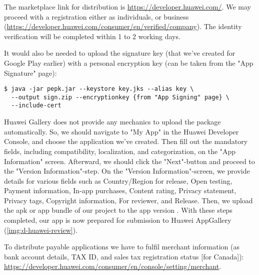 The marketplace link for distribution is \href{https://developer.huawei.com/}{https://developer.huawei.com/}.
We may proceed with a registration either as individuals, or business 
(\href{https://developer.huawei.com/consumer/en/verified/company}{https://developer.huawei.com/consumer/en/verified/company}).
The identity verification will be completed within 1 to 2 working days.

It would also be needed to upload the signature key (that we've created for Google Play earlier) with a 
personal encryption key (can be taken from the "App Signature" page):

\begin{lstlisting}[language=terminal]
$ java -jar pepk.jar --keystore key.jks --alias key \
  --output sign.zip --encryptionkey {from "App Signing" page} \
  --include-cert
\end{lstlisting}


\noindent Huawei Gallery does not provide any mechanics to upload the package automatically. So, we should navigate to 
"My App" in the Huawei Developer Console, and choose the application we've created. Then fill out the mandatory fields, 
including compatibility, localization, and categorization, on the "App Information" screen. Afterward, we should click 
the "Next"-button and proceed to the "Version Information"-step. On the "Version Information"-screen, we provide details 
for various fields such as Country/Region for release, Open testing, Payment information, In-app purchases, Content 
rating, Privacy statement, Privacy tags, Copyright information, For reviewer, and Release. Then, we upload the apk or 
app bundle of our project to the app version \issue{286}{}. With these steps completed, our app is now prepared for 
submission to Huawei AppGallery (\cref{img:d-huawei-review}).


\noindent To distribute payable applications we have to fulfil merchant information (as bank account details, TAX ID, 
and sales tax registration status [for Canada]):
\href{https://developer.huawei.com/consumer/en/console/setting/merchant}{https://developer.huawei.com/consumer/en/console/setting/merchant}.
